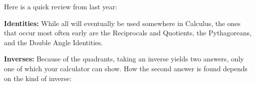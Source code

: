 \documentclass[11pt]{exam}
\begin{document}
Here is a quick review from last year: \par

\textbf{Identities: } While all will eventually be used somewhere in Calculus, the ones that occur most often early are the Reciprocals and Quotients, the Pythagoreans, and the Double Angle Identities. 

\begin{center}
\end{center}

\textbf{Inverses: } Because of the quadrants, taking an inverse yields two answers, only one of which your calculator can show.  How the second answer is found depends on the kind of inverse: 

\begin{center}
\end{center}
\end{document}
